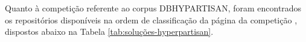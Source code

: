         
        
        
    
    
    
    
        
        
        
        
        
    Quanto à competição referente ao corpus DB\underscore{}HYPARTISAN, foram encontrados os repositórios disponíveis na ordem de classificação da página da competição \cite{PAN_HND_2019}, dispostos abaixo na Tabela \ref{tab:soluções-hyperpartisan}.
    
